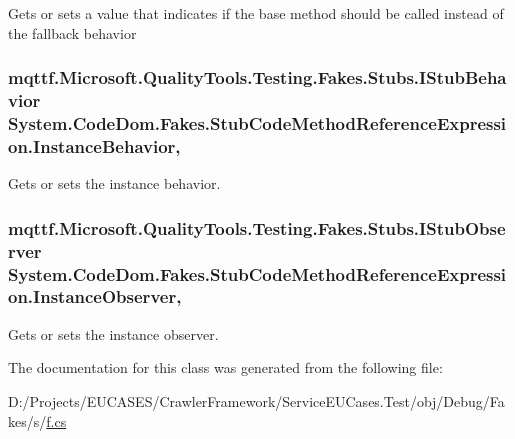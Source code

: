 Gets or sets a value that indicates if the base method should be called instead of the fallback behavior

\hypertarget{class_system_1_1_code_dom_1_1_fakes_1_1_stub_code_method_reference_expression_ab04e4ceac4632742cbd44e0375e3d0f7}{
\subsubsection[{Instance\-Behavior}]{\setlength{\rightskip}{0pt plus 5cm}mqttf.\-Microsoft.\-Quality\-Tools.\-Testing.\-Fakes.\-Stubs.\-I\-Stub\-Behavior System.\-Code\-Dom.\-Fakes.\-Stub\-Code\-Method\-Reference\-Expression.\-Instance\-Behavior\hspace{0.3cm}{\ttfamily [get]}, {\ttfamily [set]}}}\label{class_system_1_1_code_dom_1_1_fakes_1_1_stub_code_method_reference_expression_ab04e4ceac4632742cbd44e0375e3d0f7}


Gets or sets the instance behavior.

\hypertarget{class_system_1_1_code_dom_1_1_fakes_1_1_stub_code_method_reference_expression_a9e7459f260da8ce6b2cdcce29fe25b1e}{
\subsubsection[{Instance\-Observer}]{\setlength{\rightskip}{0pt plus 5cm}mqttf.\-Microsoft.\-Quality\-Tools.\-Testing.\-Fakes.\-Stubs.\-I\-Stub\-Observer System.\-Code\-Dom.\-Fakes.\-Stub\-Code\-Method\-Reference\-Expression.\-Instance\-Observer\hspace{0.3cm}{\ttfamily [get]}, {\ttfamily [set]}}}\label{class_system_1_1_code_dom_1_1_fakes_1_1_stub_code_method_reference_expression_a9e7459f260da8ce6b2cdcce29fe25b1e}


Gets or sets the instance observer.



The documentation for this class was generated from the following file\-:\begin{DoxyCompactItemize}
\item 
D\-:/\-Projects/\-E\-U\-C\-A\-S\-E\-S/\-Crawler\-Framework/\-Service\-E\-U\-Cases.\-Test/obj/\-Debug/\-Fakes/s/\hyperlink{s_2f_8cs}{f.\-cs}\end{DoxyCompactItemize}
